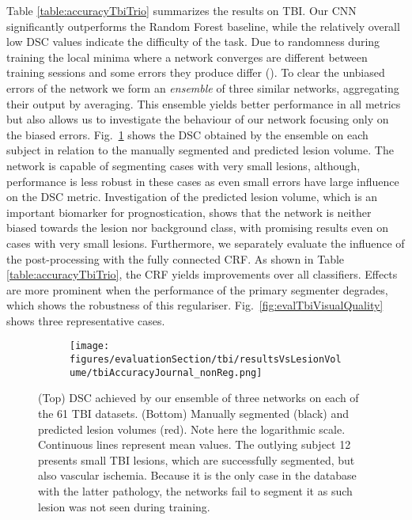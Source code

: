 \documentclass[preprint,authoryear,12pt]{elsarticle}
\begin{document}
Table \ref{table:accuracyTbiTrio} summarizes the results on TBI. Our CNN significantly outperforms the Random Forest baseline, while the relatively overall low DSC values indicate the difficulty of the task.  Due to randomness during training the local minima where a network converges are different between training sessions and some errors they produce differ (\cite{Choromanska2015}). To clear the unbiased errors of the network we form an \textit{ensemble} of three similar networks, aggregating their output by averaging. This ensemble yields better performance in all metrics but also allows us to investigate the behaviour of our network focusing only on the biased errors. Fig.~\ref{fig:evalTbiAccVsVol} shows the DSC obtained by the ensemble on each subject in relation to the manually segmented and predicted lesion volume. The network is capable of segmenting cases with very small lesions, although, performance is less robust in these cases as even small errors have large influence on the DSC metric. Investigation of the predicted lesion volume, which is an important biomarker for prognostication, shows that the network is neither biased towards the lesion nor background class, with promising results even on cases with very small lesions. Furthermore, we separately evaluate the influence of the post-processing with the fully connected CRF. As shown in Table \ref{table:accuracyTbiTrio}, the CRF yields improvements over all classifiers. Effects are more prominent when the performance of the primary segmenter degrades, which shows the robustness of this regulariser. Fig.~\ref{fig:evalTbiVisualQuality} shows three representative cases.



\begin{figure}[!ht]
\centering
\begin{subfigure}[b]{1.0\textwidth}
	\centering
\texttt{[image: figures/evaluationSection/tbi/resultsVsLesionVolume/tbiAccuracyJournal\_nonReg.png]}
\end{subfigure}
\vspace{-0pt} \caption{(Top) DSC achieved by our ensemble of three networks on each of the 61 TBI datasets. (Bottom) Manually segmented (black) and predicted lesion volumes (red). Note here the logarithmic scale. Continuous lines represent mean values. The outlying subject 12 presents small TBI lesions, which are successfully segmented, but also vascular ischemia. Because it is the only case in the database with the latter pathology, the networks fail to segment it as such lesion was not seen during training.}
\label{fig:evalTbiAccVsVol}
\vspace{-10pt}
\end{figure}
%
 
\end{document}
